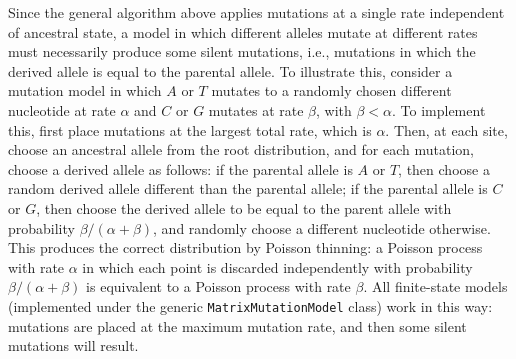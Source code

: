 \documentclass{article}
\begin{document}
Since the general algorithm above applies mutations at a single rate
independent of ancestral state,
a model in which different alleles mutate at different rates
must necessarily produce some silent mutations,
i.e., mutations in which the derived allele is equal to the parental allele.
To illustrate this, consider a mutation model
in which $A$ or $T$ mutates to a randomly chosen different nucleotide at rate $\alpha$
and $C$ or $G$ mutates at rate $\beta$, with $\beta < \alpha$.
To implement this, first place mutations at the largest total rate, which is $\alpha$.
Then, at each site, choose an ancestral allele from the root distribution,
and for each mutation, choose a derived allele as follows:
if the parental allele is $A$ or $T$, then choose a random derived allele
different than the parental allele;
if the parental allele is $C$ or $G$,
then choose the derived allele to be equal to the parent allele
with probability $\beta/(\alpha + \beta)$,
and randomly choose a different nucleotide otherwise.
This produces the correct distribution by Poisson thinning:
a Poisson process with rate $\alpha$ in which each point is discarded independently
with probability $\beta / (\alpha + \beta)$ is equivalent to a Poisson
process with rate $\beta$.
All finite-state models (implemented under the generic \texttt{MatrixMutationModel} class)
work in this way: mutations are placed at the maximum mutation rate,
and then some silent mutations will result.
\end{document}
